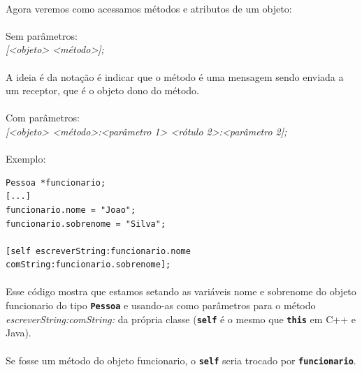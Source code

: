 \documentclass[a4paper,12pt,brazil,doubleside]{book}
\begin{document}
\paragraph{}Agora veremos como acessamos métodos e atributos de um objeto:

\paragraph{}Sem parâmetros:\\
\emph{[<objeto> <método>];}

\paragraph{}A ideia é da notação é indicar que o método é uma mensagem sendo enviada a um receptor, que é o objeto dono do método.

\paragraph{}Com parâmetros:\\
\emph{[<objeto> <método>:<parâmetro 1> <rótulo 2>:<parâmetro 2];}

\pagebreak

\paragraph{}Exemplo:

\begin{listing}
\begin{verbatim}
Pessoa *funcionario;
[...]
funcionario.nome = "Joao";
funcionario.sobrenome = "Silva";

[self escreverString:funcionario.nome comString:funcionario.sobrenome];
\end{verbatim}
\end{listing}

\paragraph{}Esse código mostra que estamos setando as variáveis nome e sobrenome do objeto funcionario do tipo \texttt{\textbf{Pessoa}} e usando-as como parâmetros para o método \emph{escreverString:comString:} da própria classe (\texttt{\textbf{self}} é o mesmo que \texttt{\textbf{this}} em C++ e Java).
\paragraph{}Se fosse um método do objeto funcionario, o \texttt{\textbf{self}} seria trocado por \texttt{\textbf{funcionario}}.
\end{document}
